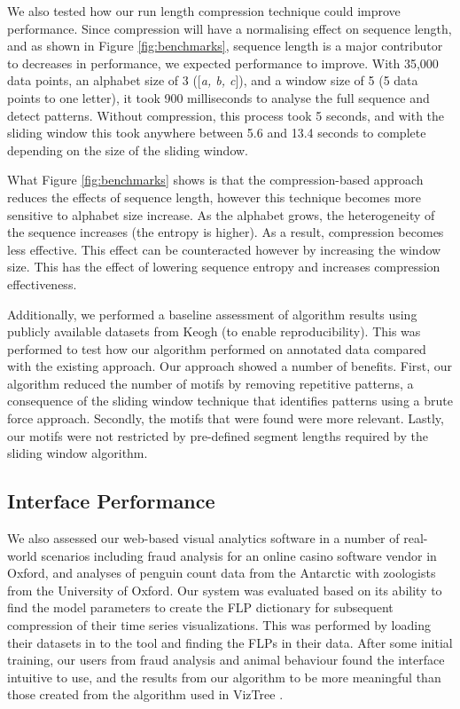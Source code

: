 We also tested how our run length compression technique could improve performance.
Since compression will have a normalising effect on sequence length, and as shown in Figure \ref{fig:benchmarks}, sequence length is a major contributor to decreases in performance, we expected performance to improve.
With 35,000 data points, an alphabet size of 3 ([\emph{a, b, c}]), and a window size of 5 (5 data points to one letter), it took 900 milliseconds to analyse the full sequence and detect patterns.
Without compression, this process took 5 seconds, and with the sliding window this took anywhere between 5.6 and 13.4 seconds to complete depending on the size of the sliding window.

What Figure \ref{fig:benchmarks} shows is that the compression-based approach reduces the effects of sequence length, however this technique becomes more sensitive to alphabet size increase.
As the alphabet grows, the heterogeneity of the sequence increases (the entropy is higher).
As a result, compression becomes less effective.
This effect can be counteracted however by increasing the window size.
This has the effect of lowering sequence entropy and increases compression effectiveness.

Additionally, we performed a baseline assessment of algorithm results using publicly available datasets from Keogh \etal \cite{shuttle_data} (to enable reproducibility).
This was performed to test how our algorithm performed on annotated data compared with the existing approach.
Our approach showed a number of benefits.
First, our algorithm reduced the number of motifs by removing repetitive patterns, a consequence of the sliding window technique that identifies patterns using a brute force approach.
Secondly, the motifs that were found were more relevant.
Lastly, our motifs were not restricted by pre-defined segment lengths required by the sliding window algorithm.

\subsection{Interface Performance}

We also assessed our web-based visual analytics software in a number of real-world scenarios including fraud analysis for an online casino software vendor in Oxford, and analyses of penguin count data from the Antarctic with zoologists from the University of Oxford.
Our system was evaluated based on its ability to find the model parameters to create the FLP dictionary for subsequent compression of their time series visualizations.
This was performed by loading their datasets in to the tool and finding the FLPs in their data.
After some initial training, our users from fraud analysis and animal behaviour found the interface intuitive to use, and the results from our algorithm to be more meaningful than those created from the algorithm used in VizTree \cite{lin2005}.

